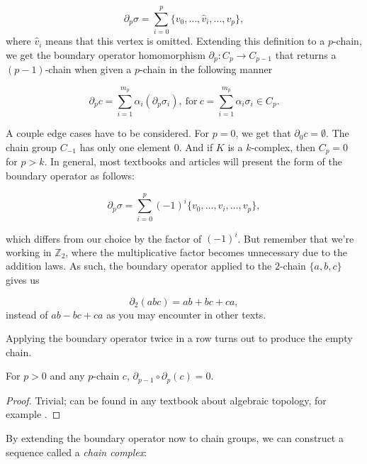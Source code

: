 \begin{equation*}
  \partial_{p}\sigma = \sum_{i=0}^{p}\{v_{0}, \ldots, \hat{v}_{i}, \ldots, v_{p}\},
\end{equation*}
where $\hat{v}_{i}$ means that this vertex is omitted. Extending this definition to a $p$-chain, we get the boundary operator homomorphism $\partial_{p}: C_{p} \to C_{p-1}$ that returns a $(p-1)$-chain when given a $p$-chain in the following manner

\begin{equation*}
  \partial_{p}c = \sum_{i=1}^{m_{p}}\alpha_{i}(\partial_{p}\sigma_{i}), \: \text{for} \: c = \sum_{i=1}^{m_{p}}\alpha_{i}\sigma_{i} \in C_{p}.
\end{equation*}

A couple edge cases have to be considered. For $p = 0$, we get that $\partial_{0}c = \emptyset$. The chain group $C_{-1}$ has only one element $0$. And if $K$ is a $k$-complex, then $C_{p} = 0$ for $p>k$. In general, most textbooks and articles will present the form of the boundary operator as follows:

\begin{equation*}
  \partial_{p}\sigma = \sum_{i=0}^{p}(-1)^{i} \{v_{0}, \ldots, \hat{v}_{i}, \ldots, v_{p}\},
\end{equation*}

which differs from our choice by the factor of $(-1)^{i}$. But remember that we're working in $\mathbb{Z}_{2}$, where the multiplicative factor becomes unnecessary due to the addition laws. As such, the boundary operator applied to the $2$-chain $\{a,b,c\}$ gives us

\begin{equation*}
  \partial_{2}(abc) = ab + bc + ca,
\end{equation*}
instead of $ab - bc + ca$ as you may encounter in other texts.

Applying the boundary operator twice in a row turns out to produce the empty chain.

\begin{lemma}
  For $p>0$ and any $p$-chain $c$, $\partial_{p-1}\circ\partial_{p}(c) = 0$.
\end{lemma}

\begin{proof}
Trivial; can be found in any textbook about algebraic topology, for example \cite{hatcher2002algebraic}.
\end{proof}

By extending the boundary operator now to chain groups, we can construct a sequence called a \textit{chain complex}:

